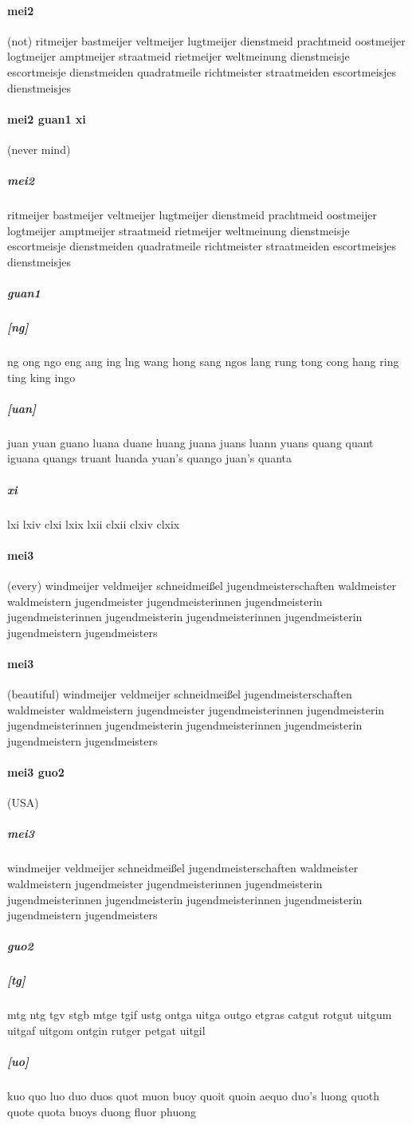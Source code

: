 \documentclass{article}
\begin{document}
\paragraph{mei2}(not) ritmeijer
bastmeijer
veltmeijer
lugtmeijer
dienstmeid
prachtmeid
oostmeijer
logtmeijer
amptmeijer
straatmeid
rietmeijer
weltmeinung
dienstmeisje
escortmeisje
dienstmeiden
quadratmeile
richtmeister
straatmeiden
escortmeisjes
dienstmeisjes
\paragraph{mei2 guan1 xi}(never mind) \subparagraph{mei2}ritmeijer
bastmeijer
veltmeijer
lugtmeijer
dienstmeid
prachtmeid
oostmeijer
logtmeijer
amptmeijer
straatmeid
rietmeijer
weltmeinung
dienstmeisje
escortmeisje
dienstmeiden
quadratmeile
richtmeister
straatmeiden
escortmeisjes
dienstmeisjes
\subparagraph{guan1}\subparagraph{[ng]}ng
ong
ngo
eng
ang
ing
lng
wang
hong
sang
ngos
lang
rung
tong
cong
hang
ring
ting
king
ingo
\subparagraph{[uan]}juan
yuan
guano
luana
duane
huang
juana
juans
luann
yuans
quang
quant
iguana
quangs
truant
luanda
yuan's
quango
juan's
quanta
\subparagraph{xi}lxi
lxiv
clxi
lxix
lxii
clxii
clxiv
clxix
\paragraph{mei3}(every) windmeijer
veldmeijer
schneidmeißel
jugendmeisterschaften
waldmeister waldmeistern
jugendmeister jugendmeisterinnen jugendmeisterin jugendmeisterinnen jugendmeisterin jugendmeisterinnen jugendmeisterin jugendmeistern jugendmeisters
\paragraph{mei3}(beautiful) windmeijer
veldmeijer
schneidmeißel
jugendmeisterschaften
waldmeister waldmeistern
jugendmeister jugendmeisterinnen jugendmeisterin jugendmeisterinnen jugendmeisterin jugendmeisterinnen jugendmeisterin jugendmeistern jugendmeisters
\paragraph{mei3 guo2}(USA) \subparagraph{mei3}windmeijer
veldmeijer
schneidmeißel
jugendmeisterschaften
waldmeister waldmeistern
jugendmeister jugendmeisterinnen jugendmeisterin jugendmeisterinnen jugendmeisterin jugendmeisterinnen jugendmeisterin jugendmeistern jugendmeisters
\subparagraph{guo2}\subparagraph{[tg]}mtg
ntg
tgv
stgb
mtge
tgif
ustg
ontga
uitga
outgo
etgras
catgut
rotgut
uitgum
uitgaf
uitgom
ontgin
rutger
petgat
uitgil
\subparagraph{[uo]}kuo
quo
luo
duo
duos
quot
muon
buoy
quoit
quoin
aequo
duo's
luong
quoth
quote
quota
buoys
duong
fluor
phuong
\end{document}
